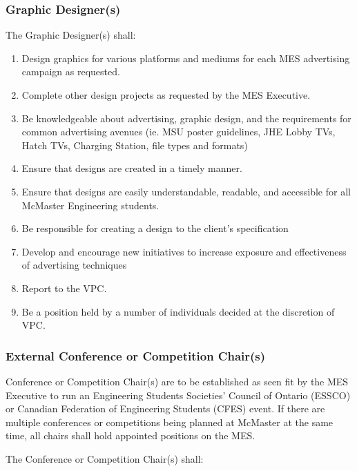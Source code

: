 \subsubsection{Graphic Designer(s)}
\label{graphic-designers}
The Graphic Designer(s) shall:

\begin{enumerate}
 \item
  Design graphics for various platforms and mediums for each MES advertising campaign as requested.
 \item
  Complete other design projects as requested by the MES Executive.
 \item
  Be knowledgeable about advertising, graphic design, and the requirements for common advertising avenues (ie. MSU poster guidelines, JHE Lobby TVs, Hatch TVs, Charging Station, file types and formats)
 \item
  Ensure that designs are created in a timely manner.
 \item
  Ensure that designs are easily understandable, readable, and accessible for all McMaster Engineering students. 
 \item    
  Be responsible for creating a design to the client's specification
 \item
  Develop and encourage new initiatives to increase exposure and effectiveness of advertising techniques
 \item
  Report to the VPC.
 \item
  Be a position held by a number of individuals decided at the discretion of VPC.

\end{enumerate}

\subsubsection{External Conference or Competition Chair(s)}
\label{external-conference-or-competition-chairs}
Conference or Competition Chair(s) are to be established as seen fit by
the MES Executive to run an Engineering Students Societies' Council of
Ontario (ESSCO) or Canadian Federation of Engineering Students (CFES)
event. If there are multiple conferences or competitions being planned
at McMaster at the same time, all chairs shall hold appointed positions
on the MES.

The Conference or Competition Chair(s) shall:

